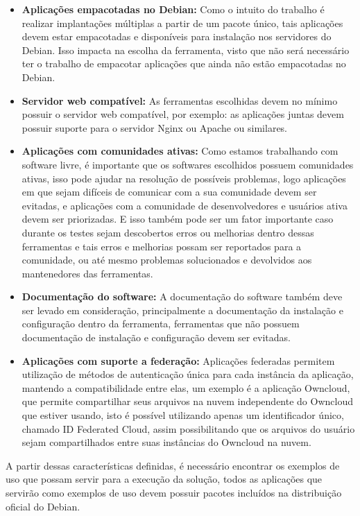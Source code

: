 \begin{itemize}
  \item  \textbf{Aplicações empacotadas no Debian:} Como o intuito do trabalho
  é realizar implantações múltiplas a partir de um pacote único, tais aplicações
  devem estar empacotadas e disponíveis para instalação nos servidores do Debian.
  Isso impacta na escolha da ferramenta, visto que não será necessário ter o trabalho
  de empacotar aplicações que ainda não estão empacotadas no Debian.
  \item  \textbf{Servidor web compatível:} As ferramentas escolhidas devem no
  mínimo possuir o servidor web compatível, por exemplo: as aplicações juntas
  devem possuir suporte para o servidor Nginx ou Apache ou similares.
  \item  \textbf{Aplicações com comunidades ativas:} Como estamos trabalhando
  com software livre, é importante que os softwares escolhidos possuem comunidades
  ativas, isso pode ajudar na resolução de possíveis problemas, logo aplicações
  em que sejam difíceis de comunicar com a sua comunidade devem ser evitadas, e
  aplicações com a comunidade de desenvolvedores e usuários ativa devem ser priorizadas.
  E isso também pode ser um fator importante caso durante os testes sejam descobertos
  erros ou melhorias dentro dessas ferramentas e tais erros e melhorias possam ser
  reportados para a comunidade, ou até mesmo problemas solucionados e devolvidos aos mantenedores
  das ferramentas.
  \item  \textbf{Documentação do software:} A documentação do software também deve
  ser levado em consideração, principalmente a documentação da instalação e configuração
  dentro da ferramenta, ferramentas que não possuem documentação de instalação e
  configuração devem ser evitadas.
  \item  \textbf{Aplicações com suporte a federação:} Aplicações federadas permitem
 utilização de métodos de autenticação única para cada instância da aplicação,
mantendo a compatibilidade entre elas, um exemplo é a aplicação Owncloud,
que permite compartilhar seus arquivos na nuvem independente do Owncloud que estiver usando,
isto é possível utilizando apenas um identificador único, chamado ID Federated Cloud, assim
possibilitando que os arquivos do usuário sejam compartilhados entre suas instâncias do
Owncloud na nuvem.
\end{itemize}

A partir dessas características definidas, é necessário encontrar os exemplos de uso
que possam servir para a execução da solução, todos as aplicações que servirão como
exemplos de uso devem possuir pacotes incluídos na distribuição oficial do Debian.

